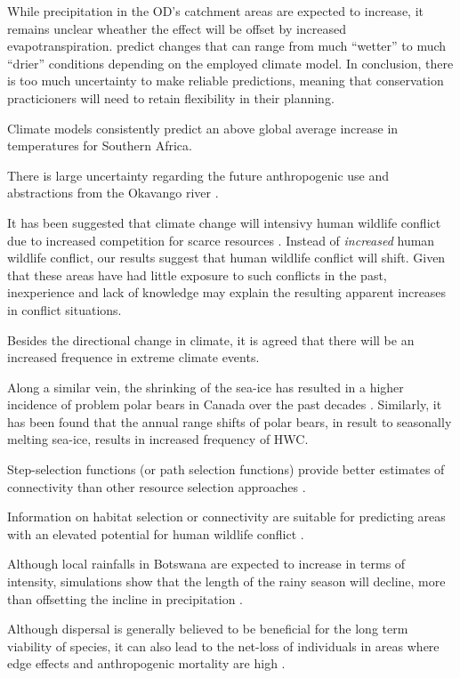 \documentclass[abstract=on,10pt,a4paper,bibliography=totocnumbered]{article}
\begin{document}
While precipitation in the OD's catchment areas are expected to increase, it
remains unclear wheather the effect will be offset by increased
evapotranspiration. \cite{Wolski.2018} predict changes that can range from much
``wetter'' to much  ``drier'' conditions depending on the employed climate
model. In conclusion, there is too much uncertainty to make reliable
predictions, meaning that conservation practicioners will need to retain
flexibility in their planning.

Climate models consistently predict an above global average increase in
temperatures for Southern Africa.

There is large uncertainty regarding the future anthropogenic use and
abstractions from the Okavango river \citep{Hughes.2011}.

It has been suggested that climate change will intensivy human wildlife conflict
due to increased competition for scarce resources \cite{Abrahms.2021}. Instead
of \textit{increased} human wildlife conflict, our results suggest that human
wildlife conflict will shift. Given that these areas have had little exposure to
such conflicts in the past, inexperience and lack of knowledge may explain the
resulting apparent increases in conflict situations.

Besides the directional change in climate, it is agreed that there will be an
increased frequence in extreme climate events.

Along a similar vein, the shrinking of the sea-ice has resulted in a higher
incidence of problem polar bears in Canada over the past decades
\citep{Towns.2009}. Similarly, it has been found that the annual range shifts of
polar bears, in result to seasonally melting sea-ice, results in increased
frequency of HWC.

Step-selection functions (or path selection functions) provide better estimates
of connectivity than other resource selection approaches \citep{Zeller.2016}.

Information on habitat selection or connectivity are suitable for predicting
areas with an elevated potential for human wildlife conflict
\citep{Buchholtz.2020}.

Although local rainfalls in Botswana are expected to increase in terms of
intensity, simulations show that the length of the rainy season will decline,
more than offsetting the incline in precipitation \cite{Akinyemi.2019}.

Although dispersal is generally believed to be beneficial for the long term
viability of species, it can also lead to the net-loss of individuals in areas
where edge effects and anthropogenic mortality are high \citep{Leigh.2012}.
\end{document}
